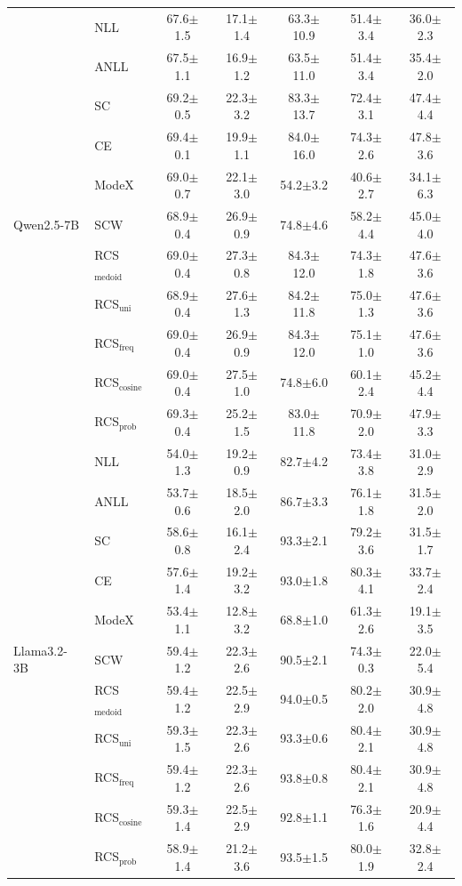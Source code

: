 \begin{table}[t]
{\begin{tabular}{ll|ccccc}
    \multirow{11}{*}{Qwen2.5-7B}
    & NLL & 67.6$\pm$1.5	& 17.1$\pm$1.4	& 63.3$\pm$10.9	& 51.4$\pm$3.4	& 36.0$\pm$2.3\\
    & ANLL & 67.5$\pm$1.1	& 16.9$\pm$1.2	& 63.5$\pm$11.0	& 51.4$\pm$3.4	& 35.4$\pm$2.0\\
    & SC  & 69.2$\pm$0.5	& 22.3$\pm$3.2	& 83.3$\pm$13.7	& 72.4$\pm$3.1	& 47.4$\pm$4.4\\
    & CE    & 69.4$\pm$0.1	& 19.9$\pm$1.1	& 84.0$\pm$16.0	& 74.3$\pm$2.6	& 47.8$\pm$3.6\\
    & ModeX & 69.0$\pm$0.7 & 22.1$\pm$3.0 & 54.2$\pm$3.2 & 40.6$\pm$2.7 & 34.1$\pm$6.3\\
    & SCW & 68.9$\pm$0.4 & 26.9$\pm$0.9 & 74.8$\pm$4.6 & 58.2$\pm$4.4 & 45.0$\pm$4.0\\
    & RCS$_\text{medoid}$  &69.0$\pm$0.4	& 27.3$\pm$0.8	&84.3$\pm$12.0	&74.3$\pm$1.8	&47.6$\pm$3.6\\
    & RCS$_\text{uni}$&68.9$\pm$0.4	&27.6$\pm$1.3	&84.2$\pm$11.8	&75.0$\pm$1.3	&47.6$\pm$3.6\\
    &  RCS$_\text{freq}$&69.0$\pm$0.4	&26.9$\pm$0.9	&84.3$\pm$12.0	&75.1$\pm$1.0	&47.6$\pm$3.6\\
    & RCS$_\text{cosine}$ & 69.0$\pm$0.4 & 27.5$\pm$1.0 & 74.8$\pm$6.0 & 60.1$\pm$2.4 & 45.2$\pm$4.4\\
    &  RCS$_\text{prob}$  &69.3$\pm$0.4	&25.2$\pm$1.5	&83.0$\pm$11.8	&70.9$\pm$2.0	&47.9$\pm$3.3\\
    \midrule

    \multirow{11}{*}{Llama3.2-3B}
    & NLL & 54.0$\pm$1.3	&19.2$\pm$0.9	&82.7$\pm$4.2	&73.4$\pm$3.8	&31.0$\pm$2.9\\
    & ANLL & 53.7$\pm$0.6	&18.5$\pm$2.0	&86.7$\pm$3.3	&76.1$\pm$1.8	&31.5$\pm$2.0\\
    & SC  & 58.6$\pm$0.8	&16.1$\pm$2.4	&93.3$\pm$2.1	&79.2$\pm$3.6	&31.5$\pm$1.7\\
    & CE    & 57.6$\pm$1.4	&19.2$\pm$3.2	&93.0$\pm$1.8	&80.3$\pm$4.1	&33.7$\pm$2.4\\
    & ModeX    & 53.4$\pm$1.1&	12.8$\pm$3.2	&68.8$\pm$1.0	&61.3$\pm$2.6	&19.1$\pm$3.5\\
    & SCW & 59.4$\pm$1.2 & 22.3$\pm$2.6 & 90.5$\pm$2.1 & 74.3$\pm$0.3 & 22.0$\pm$5.4\\
    & RCS$_\text{medoid}$  &59.4$\pm$1.2	&22.5$\pm$2.9	&94.0$\pm$0.5	&80.2$\pm$2.0	&30.9$\pm$4.8\\
    & RCS$_\text{uni}$& 59.3$\pm$1.5	&22.3$\pm$2.6	&93.3$\pm$0.6	&80.4$\pm$2.1	&30.9$\pm$4.8\\
    &  RCS$_\text{freq}$&59.4$\pm$1.2	&22.3$\pm$2.6	&93.8$\pm$0.8	&80.4$\pm$2.1	&30.9$\pm$4.8\\
    & RCS$_\text{cosine}$ & 59.3$\pm$1.4 & 22.5$\pm$2.9 & 92.8$\pm$1.1 & 76.3$\pm$1.6 & 20.9$\pm$4.4\\
    &  RCS$_\text{prob}$  &58.9$\pm$1.4	&21.2$\pm$3.6	&93.5$\pm$1.5	&80.0$\pm$1.9	&32.8$\pm$2.4\\
    \midrule


\end{tabular}}
\end{table}

